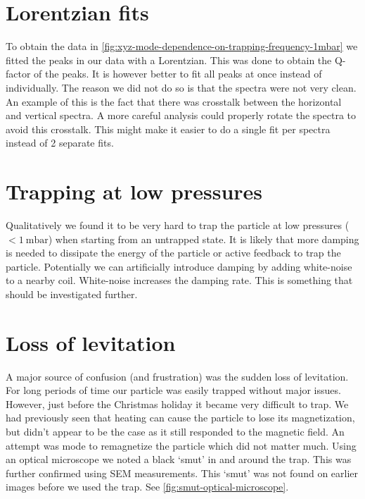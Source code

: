 \section*{Lorentzian fits}
To obtain the data in \autoref{fig:xyz-mode-dependence-on-trapping-frequency-1mbar} we fitted the peaks in our data with a Lorentzian. This was done to obtain the Q-factor of the peaks. It is however better to fit all peaks at once instead of individually. The reason we did not do so is that the spectra were not very clean. An example of this is the fact that there was crosstalk between the horizontal and vertical spectra. A more careful analysis could properly rotate the spectra to avoid this crosstalk. This might make it easier to do a single fit per spectra instead of 2 separate fits.

\section*{Trapping at low pressures}
Qualitatively we found it to be very hard to trap the particle at low pressures ($<\qty{1}{\milli\bar}$) when starting from an untrapped state. It is likely that more damping is needed to dissipate the energy of the particle or active feedback to trap the particle. Potentially we can artificially introduce damping by adding white-noise to a nearby coil. White-noise increases the damping rate\cite{millen}. This is something that should be investigated further.

\section*{Loss of levitation}
A major source of confusion (and frustration) was the sudden loss of levitation. For long periods of time our particle was easily trapped without major issues. However, just before the Christmas holiday it became very difficult to trap. We had previously seen that heating can cause the particle to lose its magnetization, but didn't appear to be the case as it still responded to the magnetic field. An attempt was mode to remagnetize the particle which did not matter much. Using an optical microscope we noted a black `smut' in and around the trap. This was further confirmed using SEM measurements. This `smut' was not found on earlier images before we used the trap. See \autoref{fig:smut-optical-microscope}.

